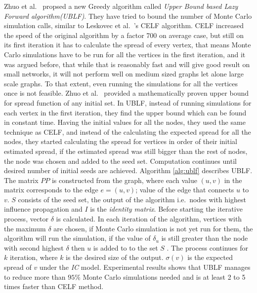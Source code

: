 \documentclass[english]{tktltiki}
\begin{document}
Zhuo et al.\ \cite{zhuo13} propsed a new Greedy algorithm called \textit{Upper Bound based Lazy Forward algorithm(UBLF)}. They have tried to bound the number of Monte Carlo simulation calls, similar to Leskovec et al.\ \cite{leskovec07}'s CELF algorithm. CELF increased the speed of the original algorithm by a factor 700 on average case, but still on its first iteration it has to calculate the spread of every vertex, that means Monte Carlo simulations have to be run for all the vertices in the first iteration, and it was argued before, that while that is reasonably fast and will give good result on small networks, it will not perform well on medium sized graphs let alone large scale graphs. To that extent, even running the simulations for all the vertices once is not feasible. Zhuo et al.\ \cite{zhuo13} provided a mathematically proven upper bound for spread function of any initial set. In UBLF, instead of running simulations for each vertex in the first iteration, they find the upper bound which can be found in constant time. Having the initial values for all the nodes, they used the same technique as CELF, and instead of the calculating the expected spread for all the nodes, they started calculating the spread for vertices in order of their initial estimated spread, if the estimated spread was still bigger than the rest of nodes, the node was chosen and added to the seed set. Computation continues until desired number of initial seeds are achieved. Algorithm \ref{alg:ublf} describes UBLF. The matrix $PP$ is constructed from the graph, where each value $(u,v)$ in the matrix corresponds to the edge $e=(u,v)$; value of the edge that connects $u$ to $v$. $S$ consists of the seed set, the output of the algorithm i.e.\ nodes with highest influence propagation and $I$ is the \textit{identity matrix}. Before starting the iterative process, vector $\delta$ is calculated. In each iteration of the algorithm, vertices with the maximum $\delta$ are chosen, if Monte Carlo simulation is not yet run for them, the algorithm will run the simulation, if the value of $\delta_u$ is still greater than the node with second highest $\delta$ then $u$ is added to to the set $S$ . The process continues for $k$ iteration, where $k$ is the desired size of the output. $\sigma(v)$ is the expected spread of $v$ under the \textit{IC} model. Experimental results shows that UBLF manages to reduce more than $95\%$ Monte Carlo simulations needed and is at least 2 to 5 times faster than CELF method.
\end{document}
